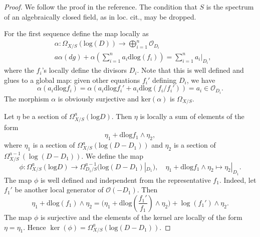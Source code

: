 \documentclass{amsart}
\theoremstyle{definition}
\newcommand\llog{\mathrm{log}}
\newcommand\dlog{\mathrm{dlog}}
\numberwithin{equation}{section}
\begin{document}
\begin{proof}
	We follow the proof in the reference. The condition that $S$ is the spectrum of an algebraically closed field, as in loc. cit., may be dropped.	

	For the first sequence define the map locally as 
	\begin{align*}
			&\alpha:\Omega_{X/S}(\textrm{log}(D))\to \bigoplus_{i=1}^n\mathcal{O}_{D_i}	\\
			 &a\alpha(dg)+\alpha(\sum_{i=1}^{n}a_i\dlog  (f_i))=\sum_{i=1}^na_i|_{D_i},
\end{align*}	
	where the $f_i$'s locally define the divisors $D_i$. Note that this is well defined and glues to a global map: given other equations $f_i'$ defining $D_i$, we have $$\alpha(a_i\dlog   f_i)=\alpha(a_i \dlog  f_i'+a_i\dlog (f_i/f_i'))=a_i\in \mathcal{O}_{D_i}.$$
	The morphism $\alpha$ is obviously surjective and $\textrm{ker}(\alpha)$ is $\Omega_{X/S}$.
	
	Let $\eta$ be a section of $\Omega_{X/S}^a(\llog D)$. Then $\eta$ is locally a sum of elements of the form 
	\[
	\eta_1 + \dlog   f_1\wedge \eta_2,
	\]
	where $\eta_1$ is a section of  $\Omega_{X/S}^a(\llog (D- D_1))$ and $\eta_2$ is a section of $\Omega_{X/S}^{a-1}(\log (D-D_1))$. We define the map
	\[
	\phi:\Omega_{X/S}^a(\llog D)\to \Omega^{a-1}_{D_1/S}(\llog(D-D_1)|_{D_1}), \quad \eta_1 + \dlog   f_1 \wedge \eta_2 \mapsto \eta_2|_{D_1}.
	\]
	 The map $\phi$ is well defined and independent from the representative $f_1$. Indeed, let $f_1'$ be another local generator of $\mathcal{O}(-D_1)$. Then 
	 \[
	 \eta_1+\dlog  (f_1)\wedge \eta_2= \big(\eta_1+\dlog  (\frac{f_1'}{f_1})\wedge \eta_2 \big)+ \log (f_1')\wedge \eta_2.
	 \]
	  The map $\phi$ is surjective and the elements of the kernel are locally of the form $\eta=\eta_1$. Hence $\ker(\phi)=\Omega_{X/S}^a(\llog( D-D_1))$.
	
\end{proof}
\end{document}
